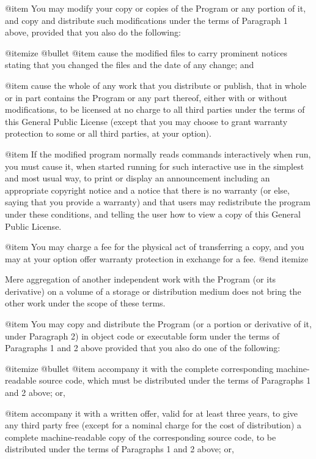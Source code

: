@item
You may modify your copy or copies of the Program or any portion of
it, and copy and distribute such modifications under the terms of Paragraph
1 above, provided that you also do the following:

@itemize @bullet
@item
cause the modified files to carry prominent notices stating that
you changed the files and the date of any change; and

@item
cause the whole of any work that you distribute or publish, that
in whole or in part contains the Program or any part thereof, either
with or without modifications, to be licensed at no charge to all
third parties under the terms of this General Public License (except
that you may choose to grant warranty protection to some or all
third parties, at your option).

@item
If the modified program normally reads commands interactively when
run, you must cause it, when started running for such interactive use
in the simplest and most usual way, to print or display an
announcement including an appropriate copyright notice and a notice
that there is no warranty (or else, saying that you provide a
warranty) and that users may redistribute the program under these
conditions, and telling the user how to view a copy of this General
Public License.

@item
You may charge a fee for the physical act of transferring a
copy, and you may at your option offer warranty protection in
exchange for a fee.
@end itemize

Mere aggregation of another independent work with the Program (or its
derivative) on a volume of a storage or distribution medium does not bring
the other work under the scope of these terms.

@item
You may copy and distribute the Program (or a portion or derivative of
it, under Paragraph 2) in object code or executable form under the terms of
Paragraphs 1 and 2 above provided that you also do one of the following:

@itemize @bullet
@item
accompany it with the complete corresponding machine-readable
source code, which must be distributed under the terms of
Paragraphs 1 and 2 above; or,

@item
accompany it with a written offer, valid for at least three
years, to give any third party free (except for a nominal charge
for the cost of distribution) a complete machine-readable copy of the
corresponding source code, to be distributed under the terms of
Paragraphs 1 and 2 above; or,


